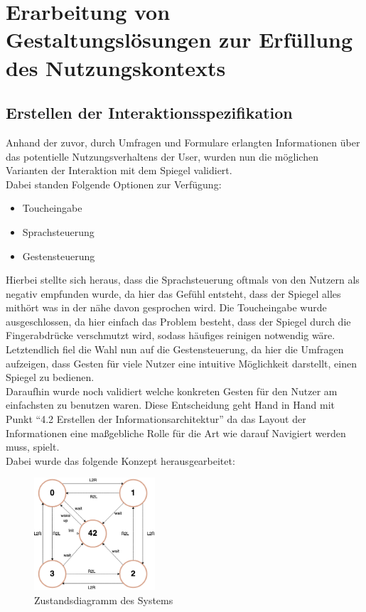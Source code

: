 \documentclass[12pt, a4paper]{scrartcl}
\begin{document}
	\newpage
	
	\section{Erarbeitung von Gestaltungslösungen zur Erfüllung des Nutzungskontexts}
	\subsection{Erstellen der Interaktionsspezifikation}
	Anhand der zuvor, durch Umfragen und Formulare erlangten Informationen über das potentielle Nutzungsverhaltens der User, wurden nun die möglichen Varianten der Interaktion mit dem Spiegel validiert.\\
	Dabei standen Folgende Optionen zur Verfügung:
	\begin{itemize}
		\setlength\itemsep{-0.5em}
		\item Toucheingabe
		\item Sprachsteuerung
		\item Gestensteuerung
	\end{itemize}
	Hierbei stellte sich heraus, dass die Sprachsteuerung oftmals von den Nutzern als negativ empfunden wurde, da hier das Gefühl entsteht, dass der Spiegel alles mithört was in der nähe davon gesprochen wird. Die Toucheingabe wurde ausgeschlossen, da hier einfach das Problem besteht, dass der Spiegel durch die Fingerabdrücke verschmutzt wird, sodass häufiges reinigen notwendig wäre.\\
	Letztendlich fiel die Wahl nun auf die Gestensteuerung, da hier die Umfragen aufzeigen, dass Gesten für viele Nutzer eine intuitive Möglichkeit darstellt, einen Spiegel zu bedienen.\\
	Daraufhin wurde noch validiert welche konkreten Gesten für den Nutzer am einfachsten zu benutzen waren. Diese Entscheidung geht Hand in Hand mit Punkt “4.2 Erstellen der Informationsarchitektur” da das Layout der Informationen eine maßgebliche Rolle für die Art wie darauf Navigiert werden muss, spielt.\\
	Dabei wurde das folgende Konzept herausgearbeitet:
	\begin{figure}[h!] 
		\centering
		\includegraphics[width=0.4\textwidth]{img/Zustandsdiagramm.png}
		\captionsetup{labelformat=empty}
		\caption{Zustandsdiagramm des Systems}
	\end{figure}\\
\end{document}
